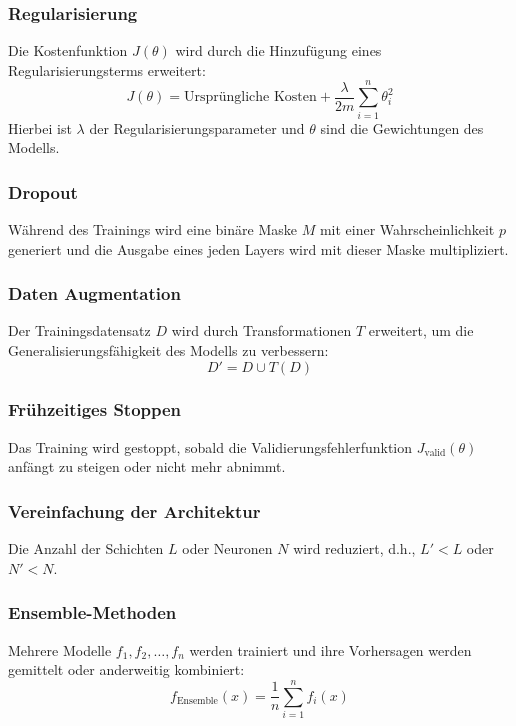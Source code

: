 \subsubsection{Regularisierung}

Die Kostenfunktion \( J(\theta) \) wird durch die Hinzufügung eines Regularisierungsterms erweitert:
\[
J(\theta) = \text{Ursprüngliche Kosten} + \frac{\lambda}{2m} \sum_{i=1}^{n} \theta_{i}^{2}
\]
Hierbei ist \( \lambda \) der Regularisierungsparameter und \( \theta \) sind die Gewichtungen des Modells.
\cite{klein_abbeel_cs188}


\subsubsection{Dropout}

Während des Trainings wird eine binäre Maske \( M \) mit einer Wahrscheinlichkeit \( p \) generiert und die Ausgabe eines jeden Layers wird mit dieser Maske multipliziert.

\subsubsection{Daten Augmentation}

Der Trainingsdatensatz \( D \) wird durch Transformationen \( T \) erweitert, um die Generalisierungsfähigkeit des Modells zu verbessern: 
\[
D' = D \cup T(D)
\]

\subsubsection{Frühzeitiges Stoppen}

Das Training wird gestoppt, sobald die Validierungsfehlerfunktion \( J_{\text{valid}}(\theta) \) anfängt zu steigen oder nicht mehr abnimmt.

\subsubsection{Vereinfachung der Architektur}

Die Anzahl der Schichten \( L \) oder Neuronen \( N \) wird reduziert, d.h., \( L' < L \) oder \( N' < N \).

\subsubsection{Ensemble-Methoden}

Mehrere Modelle \( f_{1}, f_{2}, \ldots, f_{n} \) werden trainiert und ihre Vorhersagen werden gemittelt oder anderweitig kombiniert:
\[
f_{\text{Ensemble}}(x) = \frac{1}{n} \sum_{i=1}^{n} f_{i}(x)
\]
